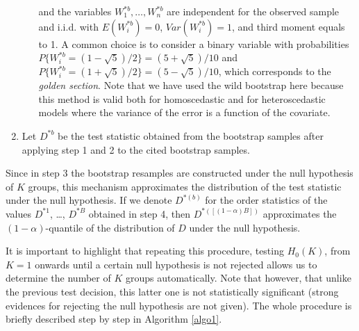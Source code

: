 \begin{enumerate}
\begin{itemize}
and the variables $W_1^{\ast b}, \ldots, W_n^{\ast b}$  are independent for the observed sample and i.i.d. with $E(W_{i}^{\ast b}) = 0$, $Var(W^{\ast b}_i) = 1$, and  third moment equals to 1. A common choice is to consider a binary variable with probabilities $P\{W_i^{\ast b} = (1-\sqrt{5})/{2}\} = (5+\sqrt{5})/{10}$ and $P\{W_i^{\ast b} = (1+\sqrt{5})/{2}\} = (5-\sqrt{5})/{10}$, which corresponds to the \textit{golden section}. Note that we have used the wild bootstrap here  \citep{citeulike:785121,liu:1988,citeulike:991599} because this method is valid both for homoscedastic and for heteroscedastic models where the variance of the error is a function of the covariate.






\end{itemize}










\item Let $D^{\ast b}$ be the test statistic obtained from the bootstrap samples after applying step 1 and 2 to the cited bootstrap samples.
\end{enumerate}


Since in step 3 the bootstrap resamples are constructed under the null hypothesis of $K$ groups, this mechanism approximates the distribution of the test statistic under the null hypothesis. If we denote $D^{\ast (b)}$ for the order statistics of the values $D^{\ast 1}$, \ldots, $D^{\ast B}$ obtained in step 4, then $D^{\ast ([(1-\alpha)B])}$ approximates the $(1-\alpha)$-quantile of the distribution of $D$ under the null hypothesis.

It is important to highlight that repeating this procedure, testing $H_0(K)$, from $K=1$ onwards until a certain null hypothesis is not rejected allows us to determine the number of  $K$ groups automatically. Note that however, that unlike the previous test decision, this latter one is not statistically significant (strong evidences for rejecting the null hypothesis are not given). The whole procedure is briefly described step by step in Algorithm \ref{algo1}. 


